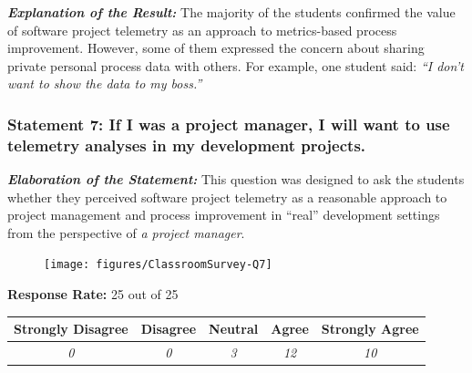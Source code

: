 \textbf{\textit{Explanation of the Result:}}
The majority of the students confirmed the value of software project telemetry as an approach to metrics-based process improvement. However, some of them expressed the concern about sharing private personal process data with others. For example, one student said: \textit{``I don't want to show the data to my boss.''}




\clearpage
\subsubsection{Statement 7: If I was a project manager, I will want to use telemetry analyses in my development projects.}

\textbf{\textit{Elaboration of the Statement:}}
This question was designed to ask the students whether they perceived software project telemetry as a reasonable approach to project management and process improvement in ``real'' development settings from the perspective of \textit{a project manager}. 

\begin{quote}\end{quote} %

\begin{figure}[h]
  \center
  \texttt{[image: figures/ClassroomSurvey-Q7]}
  \label{fig:InClassSurvey-Q7}
\end{figure}

\begin{center}\textbf{Response Rate:} 25 out of 25\end{center}
\begin{table}[h]
	\centering
		\begin{tabular}{|c|c|c|c|c|} 
			\hline
			\textbf{Strongly Disagree} & \textbf{Disagree} & \textbf{Neutral} & \textbf{Agree} & \textbf{Strongly Agree} \\
			\hline
			\textit{0} & \textit{0} & \textit{3} & \textit{12} &\textit{10} \\
			\hline
		\end{tabular}
	\label{table:InClassSurvey-Q7}
\end{table}

